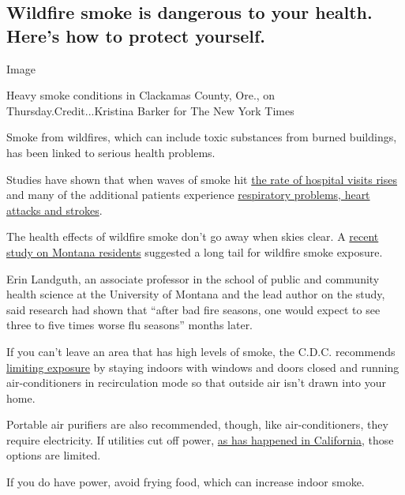 \hypertarget{wildfire-smoke-is-dangerous-to-your-health-heres-how-to-protect-yourself}{%
\subsection{Wildfire smoke is dangerous to your health. Here's how to
protect
yourself.}\label{wildfire-smoke-is-dangerous-to-your-health-heres-how-to-protect-yourself}}

Image

Heavy smoke conditions in Clackamas County, Ore., on
Thursday.Credit...Kristina Barker for The New York Times

Smoke from wildfires, which can include toxic substances from burned
buildings, has been linked to serious health problems.

Studies have shown that when waves of smoke hit
\href{https://insights.ovid.com/epidemiology/epide/2017/01/000/wildfire-specific-fine-particulate-matter-risk/13/00001648}{the
rate of hospital visits rises} and many of the additional patients
experience
\href{https://www.ncbi.nlm.nih.gov/pmc/articles/PMC6015400/}{respiratory
problems, heart attacks and strokes}.

The health effects of wildfire smoke don't go away when skies clear. A
\href{https://www.sciencedirect.com/science/article/pii/S0160412019326935}{recent
study on Montana residents} suggested a long tail for wildfire smoke
exposure.

Erin Landguth, an associate professor in the school of public and
community health science at the University of Montana and the lead
author on the study, said research had shown that ``after bad fire
seasons, one would expect to see three to five times worse flu seasons''
months later.

If you can't leave an area that has high levels of smoke, the C.D.C.
recommends
\href{https://www3.epa.gov/airnow/smoke_fires/prepare-for-fire-season-508.pdf}{limiting
exposure} by staying indoors with windows and doors closed and running
air-conditioners in recirculation mode so that outside air isn't drawn
into your home.

Portable air purifiers are also recommended, though, like
air-conditioners, they require electricity. If utilities cut off power,
\href{https://www.nytimes3xbfgragh.onion/2020/08/18/us/california-blackouts.html}{as
has happened in California}, those options are limited.

If you do have power, avoid frying food, which can increase indoor
smoke.

